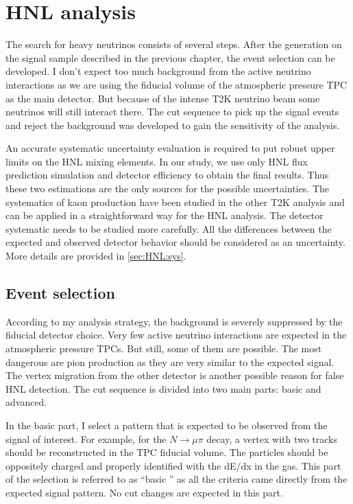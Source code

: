 \documentclass[../main.tex]{subfiles}
\begin{document}
\chapter{HNL analysis}
\label{ch:HNL:ana}

The search for heavy neutrinos consists of several steps. After the generation on the signal sample described in the previous chapter, the event selection can be developed. I don't expect too much background from the active neutrino interactions as we are using the fiducial volume of the atmospheric pressure TPC as the main detector. But because of the intense T2K neutrino beam some neutrinos will still interact there. The cut sequence to pick up the signal events and reject the background was developed to gain the sensitivity of the analysis.

An accurate systematic uncertainty evaluation is required to put robust upper limits on the HNL mixing elements. In our study, we use only HNL flux prediction simulation and detector efficiency to obtain the final results. Thus these two estimations are the only sources for the possible uncertainties. The systematics of kaon production have been studied in the other T2K analysis and can be applied in a straightforward way for the HNL analysis. The detector systematic needs to be studied more carefully. All the differences between the expected and observed detector behavior should be considered as an uncertainty. More details are provided in \autoref{sec:HNL:sys}.

\section{Event selection}
\label{sec:HNL:sel}
According to my analysis strategy, the background is severely suppressed by the fiducial detector choice. Very few active neutrino interactions are expected in the atmospheric pressure TPCs. But still, some of them are possible. The most dangerous are pion production as they are very similar to the expected signal. The vertex migration from the other detector is another possible reason for false HNL detection. The cut sequence is divided into two main parts: basic and advanced.

In the basic part, I select a pattern that is expected to be observed from the signal of interest. For example, for the $N\to\mu\pi$ decay, a vertex with two tracks should be reconstructed in the TPC fiducial volume. The particles should be oppositely charged and properly identified with the dE/dx in the gas. This part of the selection is referred to as ``basic '' as all the criteria came directly from the expected signal pattern. No cut changes are expected in this part.
\end{document}
